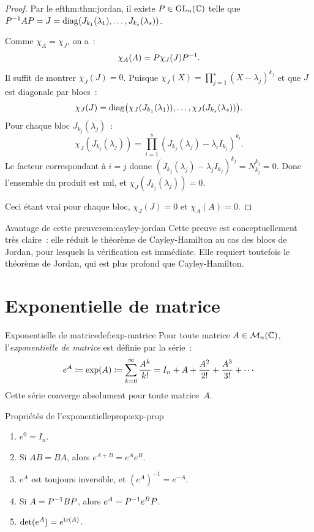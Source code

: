 \begin{proof}
  Par le 
ef{thm:thm:jordan}, il existe $P\in\operatorname{GL}_n({\mathbb{C}})$ telle que
  ${P}^{-1}AP=J=\operatorname{diag}(J_{k_1}(\lambda_1),\ldots,J_{k_s}(\lambda_s))$.

  Comme $\chi_A=\chi_J$, on a~:
  \[
    \chi_A(A)=P\chi_J(J){P}^{-1}.
  \]
  Il suffit de montrer $\chi_J(J)=0$. Puisque
  $\chi_J(X)=\prod_{j=1}^{s}(X-\lambda_j)^{k_j}$ et que $J$ est
  diagonale par blocs~:
  \[
    \chi_J(J)=\operatorname{diag}\bigl(\chi_J(J_{k_1}(\lambda_1)),\ldots,
    \chi_J(J_{k_s}(\lambda_s))\bigr).
  \]
  Pour chaque bloc $J_{k_j}(\lambda_j)$~:
  \[
    \chi_J(J_{k_j}(\lambda_j))
    =\prod_{i=1}^{s}(J_{k_j}(\lambda_j)-\lambda_i I_{k_j})^{k_i}.
  \]
  Le facteur correspondant à $i=j$ donne
  $(J_{k_j}(\lambda_j)-\lambda_j I_{k_j})^{k_j}=N_{k_j}^{k_j}=0$.
  Donc l'ensemble du produit est nul, et $\chi_J(J_{k_j}(\lambda_j))=0$.

  Ceci étant vrai pour chaque bloc, $\chi_J(J)=0$ et $\chi_A(A)=0$.
\end{proof}

\begin{remark}{Avantage de cette preuve}{rem:cayley-jordan}
  Cette preuve est conceptuellement très claire~: elle réduit le
  théorème de Cayley-Hamilton au cas des blocs de Jordan, pour lesquels
  la vérification est immédiate. Elle requiert toutefois le théorème de
  Jordan, qui est plus profond que Cayley-Hamilton.
\end{remark}


\section{Exponentielle de matrice}\label{sec:exp-matrice}

\begin{definition}{Exponentielle de matrice}{def:exp-matrice}
  Pour toute matrice $A\in\mathcal{M}_n({\mathbb{C}})$, l'\emph{exponentielle de matrice}%
   est définie par la série~:
  \[
    e^A\coloneqq\exp(A)\coloneqq\sum_{k=0}^{\infty}\frac{A^k}{k!}
    =I_n+A+\frac{A^2}{2!}+\frac{A^3}{3!}+\cdots
  \]
  Cette série converge absolument pour toute matrice~$A$.
\end{definition}

\begin{proposition}{Propriétés de l'exponentielle}{prop:exp-prop}
  \begin{enumerate}[label=(\roman*)]
    \item $e^{0}=I_n$.
    \item Si $AB=BA$, alors $e^{A+B}=e^Ae^B$.
    \item $e^A$ est toujours inversible, et $(e^A)^{-1}=e^{-A}$.
    \item Si $A={P}^{-1}BP$, alors $e^A={P}^{-1}e^BP$.
    \item $\det(e^A)=e^{\operatorname{tr}(A)}$.
  \end{enumerate}
\end{proposition}


